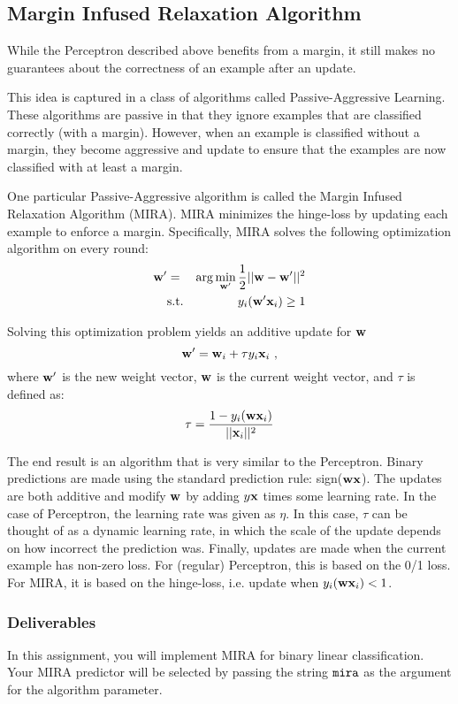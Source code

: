 \documentclass[11pt]{article}
\newcommand{\vwi}{{\bf w}_i}
\newcommand{\vw}{{\bf w}}
\newcommand{\vx}{{\bf x}}
\newcommand{\vxi}{{\bf x}_i}
\newcommand{\yi}{y_i}
\newcommand{\code}[1]{{\footnotesize \tt #1}}
\begin{document}
\subsection{Margin Infused Relaxation Algorithm}
While the Perceptron described above benefits from a margin, it still makes no guarantees about the correctness of an example after
an update.

This idea is captured in a class of algorithms called Passive-Aggressive Learning. These algorithms are passive in that they ignore examples that are classified correctly (with a margin). However, when an example is classified without a margin, they become aggressive and update to ensure that the examples are now classified with at least a margin.

One particular Passive-Aggressive algorithm is called the Margin Infused Relaxation Algorithm (MIRA). MIRA minimizes the hinge-loss
by updating each example to enforce a margin. Specifically, MIRA solves the following optimization algorithm on every round:
\begin{eqnarray}
\vw' &=& \arg \min_{\vw'} \frac{1}{2}||\vw - \vw'||^2 \nonumber \\
& \textrm{s.t.} &\yi (\vw' \vxi) \ge 1 \nonumber
\end{eqnarray}

Solving this optimization problem yields an additive update for $\vw$
\[
\vw' = \vwi + \tau \yi \vxi ~,
\]
where $\vw'$ is the new weight vector, $\vw$ is the current weight vector, and $\tau$ is defined as:
\[
\tau = \frac{1-\yi (\vw \vxi)}{||\vxi||^2}
\]

The end result is an algorithm that is very similar to the Perceptron. Binary predictions are made using the standard prediction rule: sign($\vw \vx$). The updates are both additive and modify $\vw$ by adding $y \vx$ times some learning rate. In the case of Perceptron, the learning rate was given as $\eta$. In this case, $\tau$ can be thought of as a dynamic learning rate, in which the scale of the update depends on how incorrect the prediction was. Finally, updates are made when the current example has non-zero loss. For (regular) Perceptron, this is based on the 0/1 loss. For MIRA, it is based on the hinge-loss, i.e. update when $\yi (\vw \vxi) < 1$.

\subsubsection{Deliverables}
In this assignment, you will implement MIRA for binary linear classification. Your MIRA predictor will be selected by passing the string $\code{mira}$ as the argument for the algorithm parameter.
\end{document}
